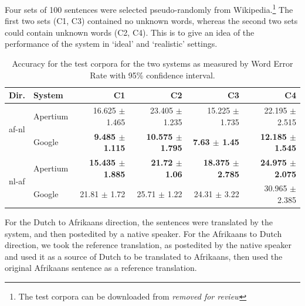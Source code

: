\documentclass[11pt]{article}
\begin{document}
Four sets of 100 sentences were selected pseudo-randomly from Wikipedia.\footnote{The test corpora can be downloaded
  from {\em removed for review} %
} The first two sets (C1, C3) contained 
no unknown words, whereas the second two sets could contain unknown words (C2, C4). This is to give an idea
of the performance of the system in `ideal' and `realistic' settings.

\begin{table}
  \begin{center}
  \begin{tabular}{|l|l|r|r|r|r|}
   \hline
   {\bf Dir.} & {\bf System}             & {\bf C1}          & {\bf C2} & {\bf C3} & {\bf C4} \\ 
   \hline
   \multirow{2}{*}{af-nl}  & {\small Apertium}  & 16.625 $\pm$ 1.465 & 23.405 $\pm$ 1.235 & 15.225 $\pm$ 1.735 & 22.195 $\pm$ 2.515 \\ 
                           & {\small Google}  & {\bf 9.485 $\pm$ 1.115} & {\bf 10.575 $\pm$ 1.795} & {\bf 7.63 $\pm$ 1.45} & {\bf 12.185 $\pm$ 1.545} \\ 
   \hline
    \multirow{2}{*}{nl-af} & {\small Apertium }  & {\bf 15.435 $\pm$ 1.885}  & {\bf 21.72 $\pm$ 1.06} & {\bf 18.375 $\pm$ 2.785} & {\bf 24.975 $\pm$ 2.075} \\
                           & {\small Google }  & 21.81 $\pm$ 1.72& 	25.71 $\pm$ 1.22&	24.31 $\pm$ 3.22&	30.965 $\pm$ 2.385 \\ 

   \hline
  \end{tabular}
    \caption{Accuracy for the test corpora for the two systems as measured by Word Error Rate 
        with 95\% confidence interval.}
    \label{table:quan}
  \end{center}
\end{table}

For the Dutch to Afrikaans direction, the sentences were translated by the system, and then
postedited by a native speaker. For the Afrikaans to Dutch direction, we took the reference 
translation, as postedited by the native speaker and used it as a source of Dutch to be translated
to Afrikaans, then used the original Afrikaans sentence as a reference translation.

\end{document}
